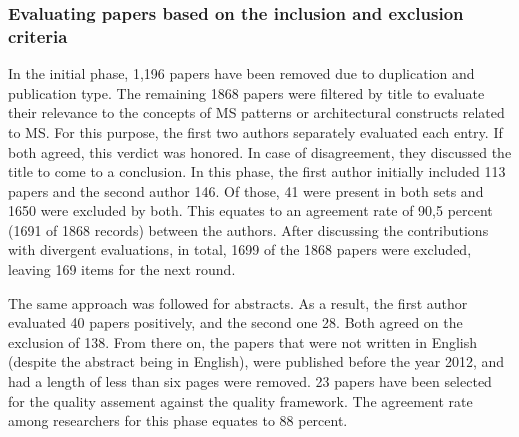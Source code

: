 \documentclass{bmcart}
\begin{document}

\subsubsection{Evaluating papers based on the inclusion and exclusion criteria}

In the initial phase, 1,196 papers have been removed due to duplication and publication type. The remaining 1868 papers were filtered by title to evaluate their relevance to the concepts of MS patterns or architectural constructs related to MS. For this purpose, the first two authors separately evaluated each entry. If both agreed, this verdict was honored. In case of disagreement, they discussed the title to come to a conclusion. In this phase, the first author initially included 113 papers and the second author 146. Of those, 41 were present in both sets and 1650 were excluded by both. This equates to an agreement rate of 90,5 percent (1691 of 1868 records) between the authors. After discussing the contributions with divergent evaluations, in total, 1699 of the 1868 papers were excluded, leaving 169 items for the next round. 

The same approach was followed for abstracts. As a result, the first author evaluated 40 papers positively, and the second one 28. Both agreed on the exclusion of 138. From there on, the papers that were not written in English (despite the abstract being in English), were published before the year 2012, and had a length of less than six pages were removed. 23 papers have been selected for the quality assement against the quality framework. The agreement rate among researchers for this phase equates to 88 percent. 




\end{document}
